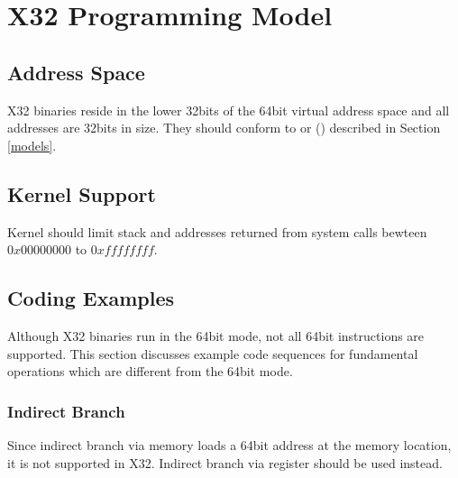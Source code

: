 \chapter{X32 Programming Model\label{x32}}

\section{Address Space}

\xARCH X32 binaries reside in the lower 32bits of the 64bit virtual
address space and all addresses are 32bits in size.  They should conform
to  or
 ()
described in Section \ref{models}.

\section{Kernel Support}
Kernel should limit stack and addresses returned from system calls
bewteen $0x00000000$ to $0xffffffff$.

\section{Coding Examples}

Although X32 binaries run in the 64bit mode, not all 64bit instructions
are supported. This section discusses example code sequences for
fundamental operations which are different from the 64bit mode.

\subsection{Indirect Branch}

Since indirect branch via memory loads a 64bit address at the memory
location, it is not supported in X32.  Indirect branch via register
should be used instead.

